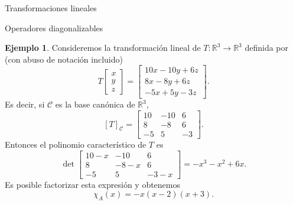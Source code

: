 \documentclass[a4paper,12pt,twoside,spanish,reqno]{amsbook}
\numberwithin{equation}{section}
\theoremstyle{definition}
\newtheorem{ejemplo}[teorema]{Ejemplo}
\theoremstyle{remark}
\newtheorem*{ejemplo*}{Ejemplo}
\newcommand{\R}{\mathbb R}
\begin{document}
\begin{chapter}{Transformaciones lineales}
\begin{section}{Operadores diagonalizables}
        
        \begin{ejemplo} \label{ej-autovectores}
            Consideremos la transformación lineal de $T:\R^3 \to \R^3$  definida por (con abuso de notación incluido)
            \begin{equation*}
                T
                \begin{bmatrix} x\\y\\z \end{bmatrix} =
                \begin{bmatrix} 10x-10y+6z\\8x -8y +6z \\-5x+5y-3z\end{bmatrix}.
            \end{equation*}
            Es decir,  si $\mathcal C$ es la base canónica de $\R^3$, 
            $$ 
            [T]_{\mathcal C}=\begin{bmatrix}10&-10&6\\8& -8& 6\\-5& 5& -3\end{bmatrix}.
            $$
            Entonces el  polinomio característico de $T$ es
            $$
            \det \begin{bmatrix}10-x&-10&6\\8& -8-x& 6\\-5& 5& -3-x\end{bmatrix} = -x^3  - x^2 + 6 x .
            $$
            Es posible factorizar esta expresión y obtenemos
            $$
            \chi_A(x) = -x (x-2)(x+3).
            $$
        \end{ejemplo}
        
    \begin{comment}
        \begin{ejemplo*}
        Sea
        $$ 
        A=\begin{bmatrix}1&2&1\\ 6&-1&0\\ -1&-2&-1\end{bmatrix},
        $$
        entonces el  polinomio característico de $A$ es
        $$
        \det \begin{bmatrix}1-x&2&1\\ 6&-1-x&0\\ -1&-2&-1-x\end{bmatrix} = -x^3 - x^2 + 12 x.
        $$
        Es posible factorizar esta expresión y obtenemos
        $$
        \chi_A(x) = -x(x-3)(x+4).
        $$
        \end{ejemplo*}
    \end{comment}	
        

\end{section}
\end{chapter}
\end{document}
